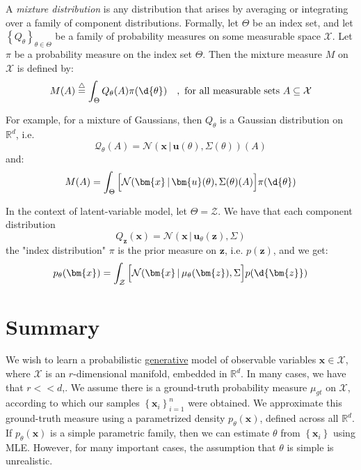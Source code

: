 \documentclass{article}
\begin{document}
\begin{definition}  A \textit{mixture distribution} is any distribution that arises by averaging or integrating over a family of component distributions. Formally, let $\Theta$ be an index set, and let $\left\{ Q_{\theta} \right\}_{\theta \in \Theta}$ be a family of probability measures on some measurable space $\mathcal{X}$. Let $\pi$ be a probability measure on the index set $\Theta$. Then the mixture measure $M$ on $\mathcal{X}$ is defined by:
\[
  M(A) \stackrel{\triangle}{=} \int_{\Theta} Q_{\theta}(A) \pi(\d{\theta}) \quad, \text{ for all measurable sets } A \subseteq \mathcal{X}
\]

For example, for a mixture of Gaussians, then $Q_{\theta}$ is a Gaussian distribution on $\mathbb{R}^{d}$, i.e. 
\[
  \mathcal{Q}_{\theta}(A) = \mathcal{N}(\bm{x} \, | \,  \bm{u}(\theta), \Sigma(\theta)) (A)
\]
and:
\[
  M(A) = \int_{\Theta} \Big[ \mathcal{N}(\bm{x} \, | \, \bm{u}(\theta), \Sigma(\theta) (A) \Big] \pi(\d{\theta})
\]


  In the context of latent-variable model, let $\Theta = \mathcal{Z}$. We have that each component distribution
  \[
    Q_{\bm{z}}(\bm{x} ) = \mathcal{N}( \bm{x} \, | \,  \bm{u}_{\theta}(\bm{z}), \Sigma)
  \]
  the "index distribution" $\pi$ is the prior measure on $\bm{z}$, i.e. $p(\bm{z})$, and we get:
  \[
    p_{\theta}(\bm{x}) = \int_{\mathcal{Z}} \Big[ \mathcal{N} (\bm{x} \, | \,  \mu_{\theta}(\bm{z}), \Sigma \Big] p(\d{\bm{z}})
  \]
\end{definition}

\section{Summary}
We wish to learn a probabilistic \ul{generative} model of observable variables $\bm{x} \in \mathcal{X}$, where $\mathcal{X}$ is an $r$-dimensional manifold, embedded in $\mathbb{R}^{d}$. In many cases, we have that $r << d$,. 
We assume there is a ground-truth probability measure $\mu_{gt}$ on $\mathcal{X}$, according to which our samples $\left\{ \bm{x}_i \right\}_{i=1}^{n}$ were obtained. 
We approximate this ground-truth measure using a parametrized density $p_{\theta}(\bm{x})$, defined across all $\mathbb{R}^{d}$. If $p_{\theta}(\bm{x})$ is a simple parametric family, then we can estimate $\theta$ from $\left\{  \bm{x}_i \right\}$ using MLE. However, for many important cases, the assumption that $\theta$ is simple is unrealistic. 
\end{document}
